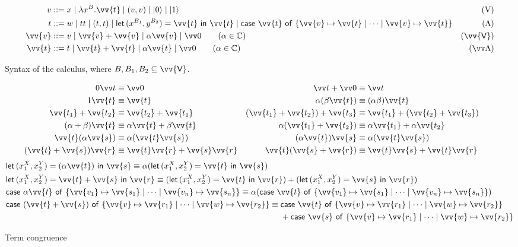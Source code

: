 \documentclass[runningheads,orivec,envcountsame,envcountsect]{llncs}
\newcommand\ket[1]{\ensuremath{|#1\rangle}}
\newcommand\s[1]{\ensuremath{\mathsf{#1}}}
\newcommand\Val{{\s V}}
\DeclareRobustCommand{\ValD}{\ensuremath{\vv{\mathsf{V}}}}
\def\C{\mathbb{C}}            %
\def\Val{\mathrm{V}}          %
\def\Pair#1#2{(#1,#2)} %
\def\Lam#1#2#3{\lambda#1^{#2}{.}#3} %
\def\letkeyword{\mathsf{let}}
\def\inkeyword{\mathsf{in}}
\def\LetP#1#2#3#4#5#6{\letkeyword\,\Pair{#1^{#2}}{#3^{#4}}=#5~\inkeyword~#6}
\def\gencase#1#2#3#4#5{\ensuremath{\mathsf{case}~#1~\mathsf{of}~\{#2\mapsto #4 \mid \dotsb \mid #3\mapsto #5\}}}
\begin{document}
\begin{table}[t]
  \begin{align*}
    v &::= x \mid \Lam{x}B{\vv{t}} \mid (v, v) \mid \ket{0} \mid \ket{1} &
    (\Val)\\
    t &::= w \mid tt \mid (t,t) \mid
    \LetP{x}{B_1}{y}{B_2}{\vv{t}}{\vv{t}}\mid
    \gencase{\vv{t}}{\vv{v}}{\vv{v}}{\vv{t}}{\vv{t}} &
    (\Lambda) \\
    \vv{v} &::= v \mid \vv{v}+\vv{v} \mid \alpha \vv{v} \mid \vv 0
    \qquad\hfill(\alpha\in\C) & (\ValD) \\
    \vv{t} &::= t \mid \vv{t}+\vv{t} \mid \alpha \vv{t} \mid \vv 0
    \qquad\hfill(\alpha\in\C) & (\vv \Lambda)
  \end{align*}
  \caption{Syntax of the calculus, where $B, B_1, B_2 \subseteq \ValD$.}
  \label{tab:Syntax}
\end{table}
\begin{table}[t]
  \begin{align*}
    0\vv t &\equiv \vv 0 & \vv t+\vv 0 &\equiv \vv t \\
    1\vv{t} &\equiv \vv{t} &
    \alpha(\beta\vv{t}) &\equiv (\alpha\beta)\vv{t} \\
    \vv{t_1}+\vv{t_2} &\equiv \vv{t_2}+\vv{t_1} &
    (\vv{t_1}+\vv{t_2})+\vv{t_3} &\equiv \vv{t_1}+(\vv{t_2}+\vv{t_3}) \\
    (\alpha+\beta)\vv{t} &\equiv \alpha\vv{t}+\beta\vv{t} &
    \alpha(\vv{t_1}+\vv{t_2}) &\equiv \alpha\vv{t_1}+\alpha\vv{t_2} \\
    \vv{t}(\alpha\vv{s}) &\equiv \alpha(\vv{t}\vv{s}) &
    (\alpha\vv{t})\vv{s} &\equiv \alpha(\vv{t}\vv{s}) \\
    (\vv{t}+\vv{s})\vv{r} &\equiv \vv{t}\vv{r}+\vv{s}\vv{r} &
    \vv{t}(\vv{s}+\vv{r}) &\equiv \vv{t}\vv{s}+\vv{t}\vv{r} &&
  \end{align*}
  \vspace{-2\baselineskip}
  \begin{align*}
    &\LetP{x_1}{X}{x_2}{Y}{(\alpha\vv{t})}{\vv{s}}
    \equiv \alpha(\LetP{x_1}{X}{x_2}{Y}{\vv{t}}{\vv{s}}) \\
    &\LetP{x_1}{X}{x_2}{Y}{\vv{t}+\vv{s}}{\vv{r}}
    \equiv
      (\LetP{x_1}{X}{x_2}{Y}{\vv{t}}{\vv{r}})
      +(\LetP{x_1}{X}{x_2}{Y}{\vv{s}}{\vv{r}}) 
      \\
    &\gencase{\alpha \vv{t}}{\vv{v_1}}{\vv{v_n}}{\vv{s_1}}{\vv{s_n}}
    \equiv \alpha(\gencase{\vv{t}}{\vv{v_1}}{\vv{v_n}}{\vv{s_1}}{\vv{s_n}}) \\
    &\gencase{(\vv{t}+\vv{s})}{\vv{v}}{\vv{w}}{\vv{r_1}}{\vv{r_2}}
    \equiv\begin{aligned}[t]
      &\gencase{\vv{t}}{\vv{v}}{\vv{w}}{\vv{r_1}}{\vv{r_2}}\\
      &+\gencase{\vv{s}}{\vv{v}}{\vv{w}}{\vv{r_1}}{\vv{r_2}}
    \end{aligned}
  \end{align*}
  \caption{Term congruence}
  \label{tab:Congruence}
\end{table}
\end{document}
